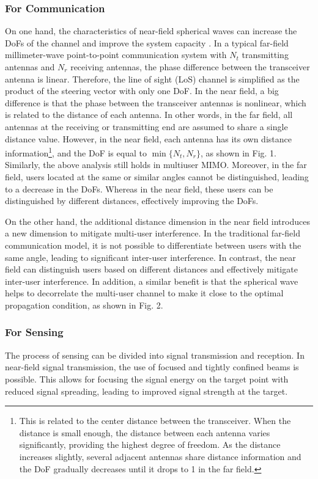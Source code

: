 \documentclass[10pt,journal,twocolumn,twoside]{IEEEtran} %
\begin{document}
\subsubsection{\textbf{For Communication}}
On one hand, the characteristics of near-field spherical waves can increase the DoFs of the channel and improve the system capacity \cite{10129110}. In a typical far-field millimeter-wave point-to-point communication system with $N_t$ transmitting antennas and $N_r$ receiving antennas, the phase difference between the transceiver antenna is linear. Therefore, the line of sight (LoS) channel is simplified as the product of the steering vector with only one DoF. In the near field, a big difference is that the phase between the transceiver antennas is nonlinear, which is related to the distance of each antenna. In other words, in the far field, all antennas at the receiving or transmitting end are assumed to share a single distance value.  
However, in the near field, each antenna has its own distance information\footnote{This is related to the center distance between the transceiver. When the distance is small enough, the distance between each antenna varies significantly, providing the highest degree of freedom. As the distance increases slightly, several adjacent antennas share distance information and the DoF gradually decreases until it drops to 1 in the far field.}, and the DoF is equal to $\min\{N_t,N_r\}$, as shown in Fig. 1. Similarly, the above analysis still holds in multiuser MIMO. Moreover, in the far field, users located at the same or similar angles cannot be distinguished, leading to a decrease in the DoFs. Whereas in the near field, these users can be distinguished by different distances, effectively improving the DoFs.

On the other hand, the additional distance dimension in the near field introduces a new dimension to mitigate multi-user interference. In the traditional far-field communication model, it is not possible to differentiate between users with the same angle, leading to significant inter-user interference. In contrast, the near field can distinguish users based on different distances and effectively mitigate inter-user interference. 
In addition, a similar benefit is that the spherical wave helps to decorrelate the multi-user channel to make it close to the optimal propagation condition, as shown in Fig. 2.


 
\subsubsection{\textbf{For Sensing}}
The process of sensing can be divided into signal transmission and reception. 
 In near-field signal transmission, the use of focused and tightly confined beams is possible. This allows for focusing the signal energy on the target point with reduced signal spreading, leading to improved signal strength at the target. 
\end{document}
